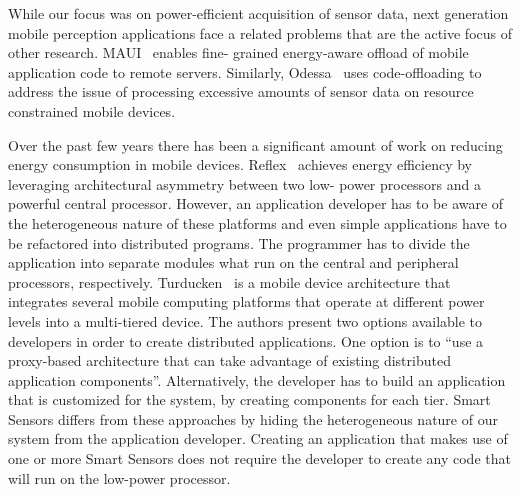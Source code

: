 While our focus was on power-efficient acquisition of sensor data, next 
generation mobile perception applications face a related problems that 
are the active focus of other research. MAUI~\cite{maui} enables fine-
grained energy-aware offload of mobile application code to remote 
servers. Similarly, Odessa~\cite{ra2011odessa} uses code-offloading to 
address the issue of processing excessive amounts of sensor data on 
resource constrained mobile devices.

\iffalse
Over the past few years there has been a significant 
amount of work on reducing energy consumption in mobile 
devices. Reflex~\cite{reflex} achieves energy efficiency 
by leveraging architectural asymmetry between two low-
power processors and a powerful central processor. 
However, an application developer has to be aware of the 
heterogeneous nature of these platforms and even simple 
applications have to be refactored into distributed 
programs. The programmer has to divide the application 
into separate modules what run on the central and 
peripheral processors, respectively. Turducken~\cite{
turducken} is a mobile device architecture that 
integrates several mobile computing platforms that 
operate at different power levels into a multi-tiered 
device. The authors present two options available to 
developers in order to create distributed applications. 
One option is to ``use a proxy-based architecture that 
can take advantage of existing distributed application 
components''. Alternatively, the developer has to build 
an application that is customized for the system, by 
creating components for each tier. Smart Sensors differs 
from these approaches by hiding the heterogeneous nature 
of our system from the application developer. Creating an 
application that makes use of one or more Smart Sensors 
does not require the developer to create any code that 
will run on the low-power processor.


